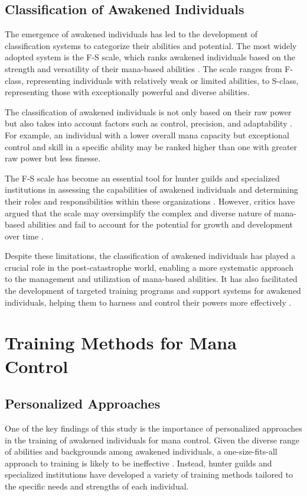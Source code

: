 \documentclass[12pt, a4paper]{article}
\begin{document}
\subsection{Classification of Awakened Individuals}
The emergence of awakened individuals has led to the development of classification systems to categorize their abilities and potential. The most widely adopted system is the F-S scale, which ranks awakened individuals based on the strength and versatility of their mana-based abilities \cite{Kim2027}. The scale ranges from F-class, representing individuals with relatively weak or limited abilities, to S-class, representing those with exceptionally powerful and diverse abilities.

The classification of awakened individuals is not only based on their raw power but also takes into account factors such as control, precision, and adaptability \cite{Nakamura2027}. For example, an individual with a lower overall mana capacity but exceptional control and skill in a specific ability may be ranked higher than one with greater raw power but less finesse.

The F-S scale has become an essential tool for hunter guilds and specialized institutions in assessing the capabilities of awakened individuals and determining their roles and responsibilities within these organizations \cite{Lee2027}. However, critics have argued that the scale may oversimplify the complex and diverse nature of mana-based abilities and fail to account for the potential for growth and development over time \cite{Seo2027}.

Despite these limitations, the classification of awakened individuals has played a crucial role in the post-catastrophe world, enabling a more systematic approach to the management and utilization of mana-based abilities. It has also facilitated the development of targeted training programs and support systems for awakened individuals, helping them to harness and control their powers more effectively \cite{Choi2027}.

\section{Training Methods for Mana Control}
\subsection{Personalized Approaches}
One of the key findings of this study is the importance of personalized approaches in the training of awakened individuals for mana control. Given the diverse range of abilities and backgrounds among awakened individuals, a one-size-fits-all approach to training is likely to be ineffective \cite{Muller2027}. Instead, hunter guilds and specialized institutions have developed a variety of training methods tailored to the specific needs and strengths of each individual.
\end{document}
